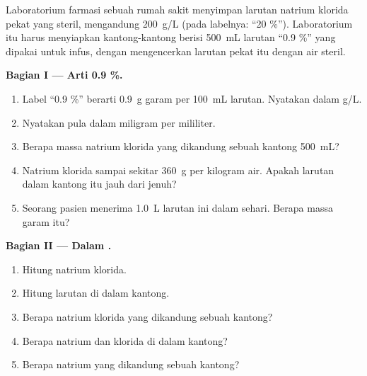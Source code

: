 \begin{problem}
\label{pb:g10:concentration-and-dilution:1}
Laboratorium farmasi sebuah rumah sakit menyimpan larutan natrium
klorida pekat yang steril, mengandung \qty{200}{g/L} (pada labelnya:
``20 \%''). Laboratorium itu harus menyiapkan kantong-kantong berisi
\qty{500}{mL} larutan ``0.9 \%'' yang dipakai untuk infus, dengan
mengencerkan larutan pekat itu dengan air steril.

\medskip
\noindent\textbf{Bagian I --- Arti 0.9 \%.}
\begin{enumerate}
  \item Label ``0.9 \%'' berarti \qty{0.9}{g} garam per \qty{100}{mL}
        larutan. Nyatakan  dalam \si{g/L}.
  \item Nyatakan pula dalam miligram per mililiter.
  \item Berapa massa natrium klorida yang dikandung sebuah kantong
        \qty{500}{mL}?
  \item Natrium klorida  sampai sekitar \qty{360}{g} per kilogram
        air. Apakah larutan dalam kantong itu jauh dari jenuh?
  \item Seorang pasien menerima \qty{1.0}{L} larutan ini dalam sehari.
        Berapa massa garam itu?
\end{enumerate}

\medskip
\noindent\textbf{Bagian II --- Dalam .}
\begin{enumerate}[resume]
  \item Hitung  natrium klorida.
  \item Hitung  larutan di dalam kantong.
  \item Berapa  natrium klorida yang dikandung sebuah kantong?
  \item Berapa   natrium dan  klorida di dalam
        kantong?
  \item Berapa  natrium yang dikandung sebuah kantong?
\end{enumerate}


\end{problem}
